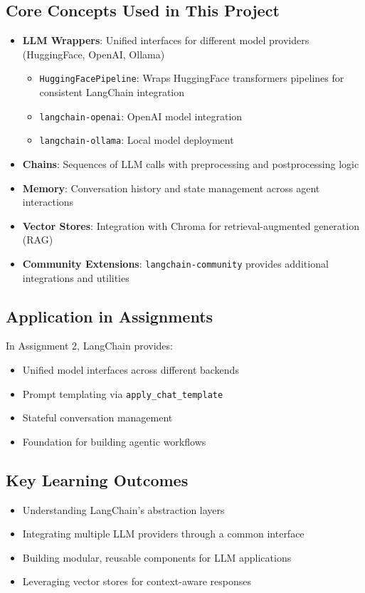 \documentclass[11pt]{article}
\begin{document}
\subsection{Core Concepts Used in This Project}
\begin{itemize}[leftmargin=2em]
    \item \textbf{LLM Wrappers}: Unified interfaces for different model providers (HuggingFace, OpenAI, Ollama)
    \begin{itemize}
        \item \texttt{HuggingFacePipeline}: Wraps HuggingFace transformers pipelines for consistent LangChain integration
        \item \texttt{langchain-openai}: OpenAI model integration
        \item \texttt{langchain-ollama}: Local model deployment
    \end{itemize}
    \item \textbf{Chains}: Sequences of LLM calls with preprocessing and postprocessing logic
    \item \textbf{Memory}: Conversation history and state management across agent interactions
    \item \textbf{Vector Stores}: Integration with Chroma for retrieval-augmented generation (RAG)
    \item \textbf{Community Extensions}: \texttt{langchain-community} provides additional integrations and utilities
\end{itemize}

\subsection{Application in Assignments}
In Assignment 2, LangChain provides:
\begin{itemize}[leftmargin=2em]
    \item Unified model interfaces across different backends
    \item Prompt templating via \texttt{apply\_chat\_template}
    \item Stateful conversation management
    \item Foundation for building agentic workflows
\end{itemize}

\subsection{Key Learning Outcomes}
\begin{itemize}[leftmargin=2em]
    \item Understanding LangChain's abstraction layers
    \item Integrating multiple LLM providers through a common interface
    \item Building modular, reusable components for LLM applications
    \item Leveraging vector stores for context-aware responses
\end{itemize}
\end{document}
